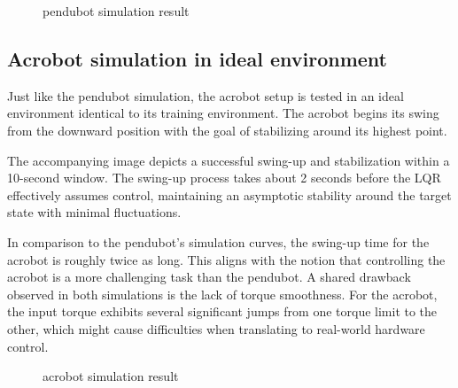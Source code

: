 \begin{figure}[H]
    \centering
    \caption{pendubot simulation result}
    \label{fig:image_a}
\end{figure}

\subsection{Acrobot simulation in ideal environment}

Just like the pendubot simulation, the acrobot setup is tested in an ideal environment identical to its training environment. The acrobot begins its swing from the downward position with the goal of stabilizing around its highest point.

The accompanying image depicts a successful swing-up and stabilization within a 10-second window. The swing-up process takes about 2 seconds before the LQR effectively assumes control, maintaining an asymptotic stability around the target state with minimal fluctuations.

In comparison to the pendubot's simulation curves, the swing-up time for the acrobot is roughly twice as long. This aligns with the notion that controlling the acrobot is a more challenging task than the pendubot. A shared drawback observed in both simulations is the lack of torque smoothness. For the acrobot, the input torque exhibits several significant jumps from one torque limit to the other, which might cause difficulties when translating to real-world hardware control.

\begin{figure}[htbp]
    \centering
    \caption{acrobot simulation result}
    \label{fig:image_b}
\end{figure}


\cleardoublepage
